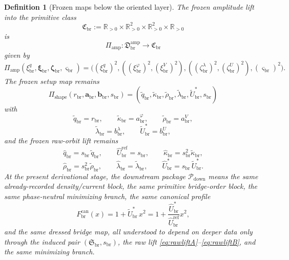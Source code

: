 \documentclass[11pt]{article}
\newcommand{\RespShapeReadout}{\widetilde q_{\mathrm{br}}}
\newcommand{\RespShapeCov}{\widetilde\kappa_{\mathrm{br}}}
\newcommand{\RespShapeRelax}{\widetilde\rho_{\mathrm{br}}}
\newcommand{\RespShapeWell}{\widetilde\lambda_{\mathrm{br}}}
\newcommand{\RespShapeEq}{\widetilde U_{\mathrm{br}}^{\ast}}
\newcommand{\RespRawReadout}{\widehat q_{\mathrm{br}}}
\newcommand{\RespRawRef}{\widehat U_{\mathrm{br}}^{\mathrm{ref}}}
\newcommand{\RespRawCov}{\widehat\kappa_{\mathrm{br}}}
\newcommand{\RespRawRelax}{\widehat\rho_{\mathrm{br}}}
\newcommand{\RespRawWell}{\widehat\lambda_{\mathrm{br}}}
\newcommand{\RespRawEq}{\widehat U_{\mathrm{br}}^{\ast}}
\newcommand{\CurvProfileCan}{F_{\mathrm{br}}^{\mathrm{can}}}
\newcommand{\DownPkg}{\mathscr P_{\mathrm{down}}}
\newcommand{\ShapeTuple}{\mathfrak S_{\mathrm{br}}}
\newcommand{\ScaleMod}{s_{\mathrm{br}}}
\newcommand{\PrimClass}{\mathfrak C_{\mathrm{br}}}
\newcommand{\PrimRead}{r_{\mathrm{br}}}
\newcommand{\PrimCovSlot}{a_{\mathrm{br}}^{\varphi}}
\newcommand{\PrimRelaxSlot}{a_{\mathrm{br}}^{V}}
\newcommand{\PrimKinetic}{\bm a_{\mathrm{br}}}
\newcommand{\PrimWellSlot}{b_{\mathrm{br}}^{\lambda}}
\newcommand{\PrimEqSlot}{b_{\mathrm{br}}^{U}}
\newcommand{\PrimAnchor}{\bm b_{\mathrm{br}}}
\newcommand{\LiftSector}{\mathfrak D_{\mathrm{br}}^{\mathrm{amp}}}
\newcommand{\DeepReadAmp}{\xi_{\mathrm{br}}^{q}}
\newcommand{\DeepCovAmp}{\xi_{\mathrm{br}}^{\varphi}}
\newcommand{\DeepRelaxAmp}{\xi_{\mathrm{br}}^{V}}
\newcommand{\DeepKinAmp}{\bm\xi_{\mathrm{br}}}
\newcommand{\DeepWellAmp}{\zeta_{\mathrm{br}}^{\lambda}}
\newcommand{\DeepEqAmp}{\zeta_{\mathrm{br}}^{U}}
\newcommand{\DeepAnchorAmp}{\bm\zeta_{\mathrm{br}}}
\newcommand{\DeepScaleAmp}{\varsigma_{\mathrm{br}}}
\newcommand{\AmpMap}{\Pi_{\mathrm{amp}}}
\newcommand{\PrimMap}{\Pi_{\mathrm{shape}}}
\newtheorem{definition}{Definition}
\begin{document}
\begin{definition}[Frozen maps below the oriented layer]
\label{def:frozenmaps}
The frozen amplitude lift into the primitive class
\begin{equation}
\PrimClass
:=
\mathbb R_{>0}\times\mathbb R_{>0}^{2}\times\mathbb R_{>0}^{2}\times\mathbb R_{>0}
\label{eq:primclass}
\end{equation}
is
\begin{equation}
\AmpMap:\LiftSector\longrightarrow\PrimClass
\label{eq:ampmap}
\end{equation}
given by
\begin{equation}
\AmpMap(\DeepReadAmp,\DeepKinAmp,\DeepAnchorAmp,\DeepScaleAmp)
=
\bigl(
(\DeepReadAmp)^{2},
((\DeepCovAmp)^{2},(\DeepRelaxAmp)^{2}),
((\DeepWellAmp)^{2},(\DeepEqAmp)^{2}),
(\DeepScaleAmp)^{2}
\bigr).
\label{eq:ampmapexplicit}
\end{equation}
The frozen setup map remains
\begin{equation}
\PrimMap(\PrimRead,\PrimKinetic,\PrimAnchor,\ScaleMod)
=
(\RespShapeReadout,\RespShapeCov,\RespShapeRelax,\RespShapeWell,\RespShapeEq,\ScaleMod)
\label{eq:primmap}
\end{equation}
with
\begin{equation}
\RespShapeReadout=\PrimRead,
\qquad
\RespShapeCov=\PrimCovSlot,
\qquad
\RespShapeRelax=\PrimRelaxSlot,
\label{eq:shapeA}
\end{equation}
\begin{equation}
\RespShapeWell=\PrimWellSlot,
\qquad
\RespShapeEq=\PrimEqSlot,
\label{eq:shapeB}
\end{equation}
and the frozen raw-orbit lift remains
\begin{equation}
\RespRawReadout=\ScaleMod\,\RespShapeReadout,
\qquad
\RespRawRef=\ScaleMod,
\qquad
\RespRawCov=\ScaleMod^{2}\RespShapeCov,
\label{eq:rawliftA}
\end{equation}
\begin{equation}
\RespRawRelax=\ScaleMod^{2}\RespShapeRelax,
\qquad
\RespRawWell=\RespShapeWell,
\qquad
\RespRawEq=\ScaleMod\,\RespShapeEq.
\label{eq:rawliftB}
\end{equation}
At the present derivational stage, the downstream package \(\DownPkg\) means the same already-recorded density/current block, the same primitive bridge-order block, the same phase-neutral minimizing branch, the same canonical profile
\begin{equation}
\CurvProfileCan(x)=1+\RespShapeEq\,x^2
=
1+\frac{\RespRawEq}{\RespRawRef}x^2,
\label{eq:profile}
\end{equation}
and the same dressed bridge map, all understood to depend on deeper data only through the induced pair \((\ShapeTuple,\ScaleMod)\), the raw lift \eqref{eq:rawliftA}--\eqref{eq:rawliftB}, and the same minimizing branch.
\end{definition}
\end{document}
